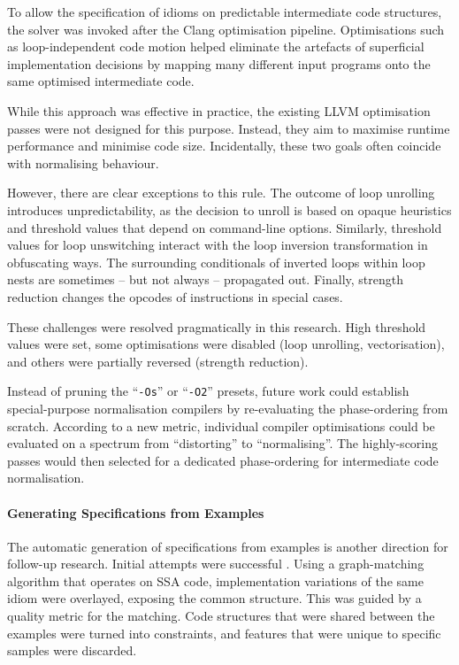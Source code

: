     To allow the specification of idioms on predictable intermediate code
    structures, the solver was invoked after the Clang optimisation pipeline.
    Optimisations such as loop-independent code motion helped eliminate the
    artefacts of superficial implementation decisions by mapping many different
    input programs onto the same optimised intermediate code.

    While this approach was effective in practice, the existing LLVM
    optimisation passes were not designed for this purpose.
    Instead, they aim to maximise runtime performance and minimise code size.
    Incidentally, these two goals often coincide with normalising behaviour.

    However, there are clear exceptions to this rule.
    The outcome of loop unrolling introduces unpredictability, as the decision
    to unroll is based on opaque heuristics and threshold values that depend
    on command-line options.
    Similarly, threshold values for loop unswitching interact with the loop
    inversion transformation in obfuscating ways.
    The surrounding conditionals of inverted loops within loop nests are
    sometimes -- but not always -- propagated out.
    Finally, strength reduction changes the opcodes of instructions in special
    cases.

    These challenges were resolved pragmatically in this research.
    High threshold values were set, some optimisations were disabled
    (loop unrolling, vectorisation), and others were partially reversed
    (strength reduction).

    Instead of pruning the ``{\tt-Os}'' or ``{\tt -O2}'' presets, future work
    could establish special-purpose normalisation compilers by re-evaluating the
    phase-ordering from scratch.
    According to a new metric, individual compiler optimisations could be
    evaluated on a spectrum from ``distorting'' to ``normalising''.
    The highly-scoring passes would then selected for a dedicated
    phase-ordering for intermediate code normalisation.

    \paragraph*{Generating Specifications from Examples}
    The automatic generation of specifications from examples is another
    direction for follow-up research.
    Initial attempts were successful \citep{DBLP:conf/IEEEpact/CollieGO19}.
    Using a graph-matching algorithm that operates on SSA code, implementation
    variations of the same idiom were overlayed, exposing the common structure.
    This was guided by a quality metric for the matching.
    Code structures that were shared between the examples were turned into
    constraints, and features that were unique to specific samples were
    discarded.

